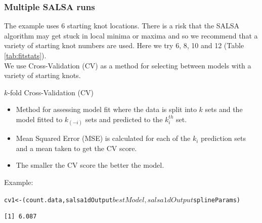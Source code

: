 \begin{frame}[fragile]
\frametitle{Multiple SALSA runs}

\noindent The example uses 6 starting knot locations.  There is a risk that the SALSA algorithm may get stuck in local minima or maxima and so we recommend that a variety of starting knot numbers are used.  Here we try 6, 8, 10 and 12 (Table \ref{tab:fitstats}).  \\

\noindent We use Cross-Validation (CV) as a method for selecting between models with a variety of starting knots.\\

\begin{block}{$k$-fold Cross-Validation (CV)}
\begin{itemize}
\item Method for assessing model fit where the data is split into $k$ sets and the model fitted to $k_{(-i)}$ sets and predicted to the $k_i^{th}$ set.\\
\item Mean Squared Error (MSE) is calculated for each of the $k_i$ prediction sets and a mean taken to get the CV score.\\
\item The smaller the CV score the better the model.
\end{itemize}
\end{block}

\noindent Example:
\begin{knitrout}\footnotesize
{}\color{fgcolor}
\end{knitrout}

\begin{knitrout}\footnotesize
{}\color{fgcolor}\begin{kframe}
\begin{alltt}
cv1 <- (count.data, salsa1dOutput$bestModel, 
           salsa1dOutput$splineParams)
\end{alltt}
\begin{verbatim}
[1] 6.087
\end{verbatim}
\end{kframe}
\end{knitrout}

\end{frame}

